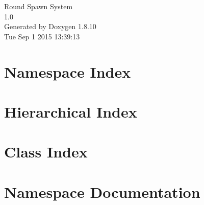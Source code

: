 \documentclass[twoside]{book}
\newcommand{\+}{\discretionary{\mbox{\scriptsize$\hookleftarrow$}}{}{}}
\newcommand{\clearemptydoublepage}{%
  \newpage{\pagestyle{empty}\cleardoublepage}%
}
\begin{document}
\hypersetup{pageanchor=false,
             bookmarks=true,
             bookmarksnumbered=true,
             pdfencoding=unicode
            }
\begin{titlepage}
\vspace*{7cm}
\begin{center}%
{\Large Round Spawn System \\[1ex]\large 1.\+0 }\\
\vspace*{1cm}
{\large Generated by Doxygen 1.8.10}\\
\vspace*{0.5cm}
{\small Tue Sep 1 2015 13:39:13}\\
\end{center}
\end{titlepage}
\clearemptydoublepage
\tableofcontents
\clearemptydoublepage
{}
\hypersetup{pageanchor=true}

\chapter{Namespace Index}

\chapter{Hierarchical Index}

\chapter{Class Index}

\chapter{Namespace Documentation}


\end{document}
